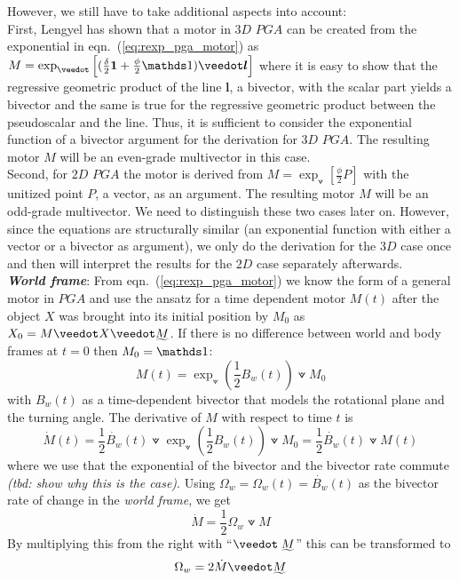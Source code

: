 However, we still have to take additional aspects into account: \\

First, Lengyel has shown that a motor in $3D$ $PGA$ can be created from the exponential in
eqn.~(\ref{eq:rexp_pga_motor}) as $M = \exp_\veedot\left[(\frac{\delta}{2} \bm{1} +
\frac{\phi}{2}\ps) \veedot \bm{l} \right]$ where it is easy to show that the regressive
geometric product of the line $\bm{l}$, a bivector, with the scalar part yields a bivector
and the same is true for the regressive geometric product between the pseudoscalar and the
line. Thus, it is sufficient to consider the exponential function of a bivector argument
for the derivation for $3D$ $PGA$. The resulting motor $M$ will be an even-grade
multivector in this case. \\

Second, for $2D$ $PGA$ the motor is derived from $M = \exp_\veedot\left[\frac{\phi}{2} P
\right]$ with the unitized point $P$, a vector, as an argument. The resulting motor $M$
will be an odd-grade multivector. We need to distinguish these two cases later on.
However, since the equations are structurally similar (an exponential function with either
a vector or a bivector as argument), we only do the derivation for the $3D$ case once and
then will interpret the results for the $2D$ case separately afterwards. \\

\textbf{\emph{World frame}}: From eqn.~(\ref{eq:rexp_pga_motor}) we know the form of a
general motor in $PGA$ and use the ansatz for a time dependent motor $M(t)$ after the
object $X$ was brought into its initial position by $M_0$ as $X_0 = M \veedot X \veedot
\rrev{M}$. If there is no difference between world and body frames at $t=0$ then
$M_0=\ps$:
\begin{equation}
   M(t) = \exp_\veedot(\frac{1}{2}B_w(t)) \veedot M_0
   \label{eq:motor_pga_world_frame}
\end{equation}
with $B_w(t)$ as a time-dependent bivector that models the rotational plane and the
turning angle. The derivative of $M$ with respect to time $t$ is
\begin{equation}
   \dot{M}(t) = \frac{1}{2} \dot{B_w}(t) \veedot
                \exp_\veedot (\frac{1}{2}B_w(t)) \veedot M_0
              = \frac{1}{2} \dot{B_w}(t) \veedot M(t)   
\end{equation}
where we use that the exponential of the bivector and the bivector rate commute
\emph{(tbd: show why this is the case)}. Using $\Omega_w = \Omega_w(t) = \dot{B_w}(t)$ as
the bivector rate of change in the \emph{world frame}, we get
\begin{equation}
   \dot{M} = \frac{1}{2} \Omega_w \veedot M 
   \label{eq:motor_rate_world_frame_pga}   
\end{equation}
By multiplying this from the right with ``$\veedot\;\rrev{M}$'' this can be transformed to
\begin{equation}
   \Omega_w = 2 \dot{M} \veedot \rrev{M}
   \label{eq:bivector_rate_world_frame_pga}
\end{equation}

